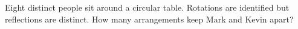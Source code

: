 Eight distinct people sit around a circular table. Rotations are identified but reflections are distinct. How many arrangements keep Mark and Kevin apart?
